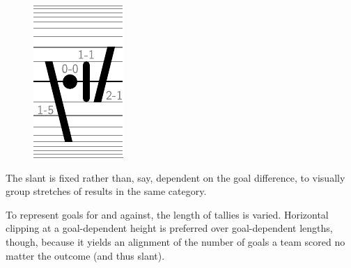 \documentclass[a4paper,12pt]{ltxdoc}
\begin{document}
\begin{figure}
\includegraphics[width=\linewidth]{basics}
\end{figure}
The slant is fixed rather than, say,
dependent on the goal difference,
to visually group stretches of results in the same category. 

To represent goals for and against, the length of tallies is varied. 
Horizontal clipping at a goal-dependent height
is preferred over goal-dependent lengths, though,
because it yields an alignment of the number of goals a team scored
no matter the outcome (and thus slant). 
\end{document}
